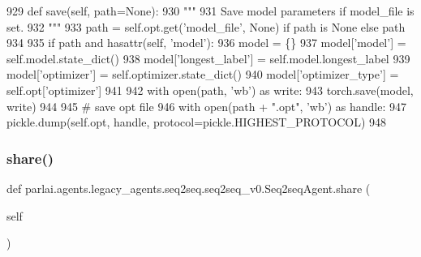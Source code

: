 \begin{DoxyCode}
929     \textcolor{keyword}{def }save(self, path=None):
930         \textcolor{stringliteral}{"""}
931 \textcolor{stringliteral}{        Save model parameters if model\_file is set.}
932 \textcolor{stringliteral}{        """}
933         path = self.opt.get(\textcolor{stringliteral}{'model\_file'}, \textcolor{keywordtype}{None}) \textcolor{keywordflow}{if} path \textcolor{keywordflow}{is} \textcolor{keywordtype}{None} \textcolor{keywordflow}{else} path
934 
935         \textcolor{keywordflow}{if} path \textcolor{keywordflow}{and} hasattr(self, \textcolor{stringliteral}{'model'}):
936             model = \{\}
937             model[\textcolor{stringliteral}{'model'}] = self.model.state\_dict()
938             model[\textcolor{stringliteral}{'longest\_label'}] = self.model.longest\_label
939             model[\textcolor{stringliteral}{'optimizer'}] = self.optimizer.state\_dict()
940             model[\textcolor{stringliteral}{'optimizer\_type'}] = self.opt[\textcolor{stringliteral}{'optimizer'}]
941 
942             with open(path, \textcolor{stringliteral}{'wb'}) \textcolor{keyword}{as} write:
943                 torch.save(model, write)
944 
945             \textcolor{comment}{# save opt file}
946             with open(path + \textcolor{stringliteral}{".opt"}, \textcolor{stringliteral}{'wb'}) \textcolor{keyword}{as} handle:
947                 pickle.dump(self.opt, handle, protocol=pickle.HIGHEST\_PROTOCOL)
948 
\end{DoxyCode}
\mbox{\label{classparlai_1_1agents_1_1legacy__agents_1_1seq2seq_1_1seq2seq__v0_1_1Seq2seqAgent_ac050147b69c47182730e92866f64156a}} 
\subsubsection{\texorpdfstring{share()}{share()}}
{\footnotesize\ttfamily def parlai.\+agents.\+legacy\+\_\+agents.\+seq2seq.\+seq2seq\+\_\+v0.\+Seq2seq\+Agent.\+share (\begin{DoxyParamCaption}\item[{}]{self }\end{DoxyParamCaption})}

